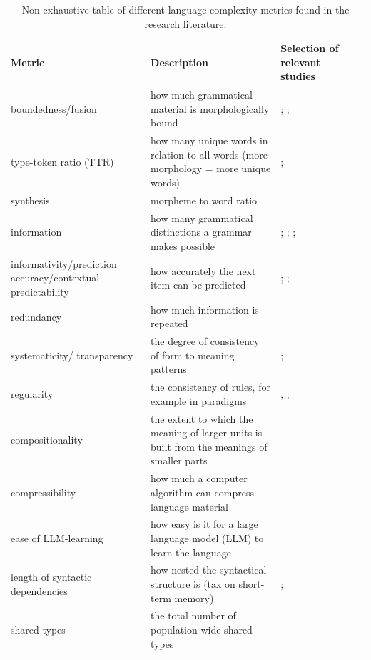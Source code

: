 \documentclass[USenglish]{article}
\begin{document}
\begin{table}[h]
    \centering
    \begin{tabular}{p{3cm}p{5cm}p{3cm}p{2cm}p{2cm}}  %
        \toprule
        \textbf{Metric} & \textbf{Description}  & \textbf{Selection of relevant studies } \\ 
        \midrule
       boundedness/fusion   & how much grammatical material is morphologically bound &  \cite{grambank_release}; \cite{shcherbakova2023societies}; \citet{lupyan2010language} \\ 
         \midrule
        type-token ratio (TTR) & how many unique words in relation to all words (more morphology = more unique words)  & \cite{kettunen2014can}; \citet{ccoltekin2023complexity}\\ 
               \midrule
 synthesis & morpheme to word ratio  & \citet{easterday2021syllable} \\
                     \midrule
     information      & how many grammatical distinctions a grammar makes possible & \cite{shcherbakova2023societies};  \cite{grambank_release}; \citet{lupyan2010language}; \citet{ccoltekin2023complexity}\\
\midrule
informativity/prediction accuracy/contextual predictability  & how accurately the next item can be predicted & \cite{frank2011insensitivity}; \citet{cohen2008phone}; \citet{levshina2022frequency} \\    \midrule
redundancy  & how much information is repeated & \cite{leufkens2023measuring}\\    \midrule
systematicity/ transparency  & the degree of consistency of form to meaning patterns & \cite{raviv2019larger}; \cite{hengeveld2018transparent} \\    \midrule
regularity & the consistency of rules, for example in paradigms &  \cite{round2022cognition}‚ \cite{ackerman2009parts}; \cite{cotterell2019complexity} \\    \midrule
compositionality  & the extent to which the meaning of larger units is built from the meanings of smaller parts &  \cite{wray2007consequences} \\    \midrule
compressibility  & how much a computer algorithm can compress language material &  \cite{juola1998measuring} \\    \midrule
ease of LLM-learning  & how easy is it for a large language model (LLM) to learn the language &  \cite{koplenig2023languages}  \\    \midrule
length of syntactic dependencies  &  how nested the syntactical structure is (tax on short-term memory) & \cite{gibson1998linguistic}; \citet{liu2008dependency} \\    
\midrule
shared types & the total number of population-wide shared types &  \citet{spike2017population}\\
\bottomrule
    \end{tabular}
    \caption{Non-exhaustive table of different language complexity metrics found in the research literature.}
    \label{tab:complex_metrics}
\end{table}
\end{document}

